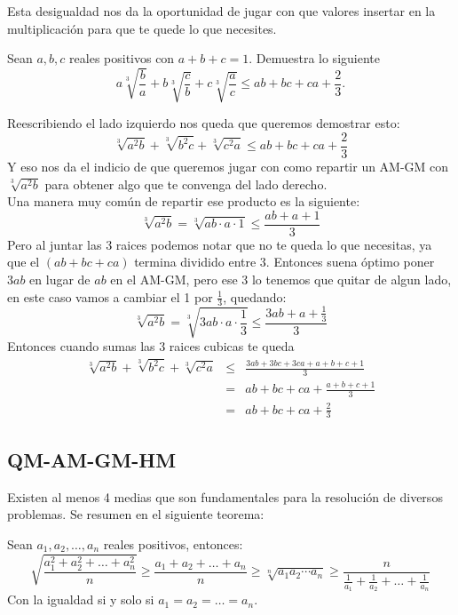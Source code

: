 \documentclass[11pt]{scrartcl}
\begin{document}
\noindent
Esta desigualdad nos da la oportunidad de jugar con que valores insertar en la multiplicaci\'on para que te quede lo que necesites.

\begin{example}
    \label{JBMOSL22-A3}
    Sean $a,b,c$ reales positivos con $a+b+c=1$. Demuestra lo siguiente
    \[a \sqrt[3]{\frac{b}{a}} + b \sqrt[3]{\frac{c}{b}} + c \sqrt[3]{\frac{a}{c}} \le ab + bc + ca + \frac{2}{3}.\]
\end{example}

\begin{soln}

\noindent
Reescribiendo el lado izquierdo nos queda que queremos demostrar esto:
\[ \sqrt[3]{a^2b}+\sqrt[3]{b^2c}+\sqrt[3]{c^2a} \le ab+bc+ca+\frac 23\]
Y eso nos da el indicio de que queremos jugar con como repartir un AM-GM con $\sqrt[3]{a^2b}$ para obtener algo que te convenga del lado derecho. \\
Una manera muy com\'un de repartir ese producto es la siguiente:
\[ \sqrt[3]{a^2b}=\sqrt[3]{ab \cdot a\cdot 1 } \leq \frac{ab+a+1}{3}\]
Pero al juntar las 3 raices podemos notar que no te queda lo que necesitas, ya que el $(ab+bc+ca)$ termina dividido entre 3. Entonces suena \'optimo poner $3ab$ en lugar de $ab$ en el AM-GM, pero ese 3 lo tenemos que quitar de algun lado, en este caso vamos a cambiar el 1 por $\frac 13$, quedando:
\[
\sqrt[3]{a^2b}=\sqrt[3]{3ab\cdot a \cdot \frac 13}\leq \frac{3ab+a+\frac13}{3}
\]
Entonces cuando sumas las 3 raices cubicas te queda 
\begin{eqnarray*}
     \sqrt[3]{a^2b}+\sqrt[3]{b^2c}+\sqrt[3]{c^2a} &\le& \frac{3ab+3bc+3ca+a+b+c+1}{3} \\
     &=& ab+bc+ca+\frac{a+b+c+1}{3} \\
     &=& ab+bc+ca+\frac 23
\end{eqnarray*}


\end{soln}

\vspace{0.5cm}

\subsection{QM-AM-GM-HM}

\noindent
Existen al menos 4 medias que son fundamentales para la resoluci\'on de diversos problemas. Se resumen en el siguiente teorema:

\begin{theorem} [QM-AM-GM-HM]
Sean $a_1,a_2, \ldots, a_n$ reales positivos, entonces:
$$\sqrt{\frac{a_1^2+a_2^2+\ldots+a_n^2}{n}} \geq \frac{a_1+a_2+\ldots+a_n}{n} \geq \sqrt[n]{a_1a_2\cdots a_n} \geq \frac{n}{\frac{1}{a_1}+\frac{1}{a_2}+\ldots+\frac{1}{a_n}}$$
Con la igualdad si y solo si $a_1=a_2=\ldots=a_n$.
\end{theorem}
\end{document}
